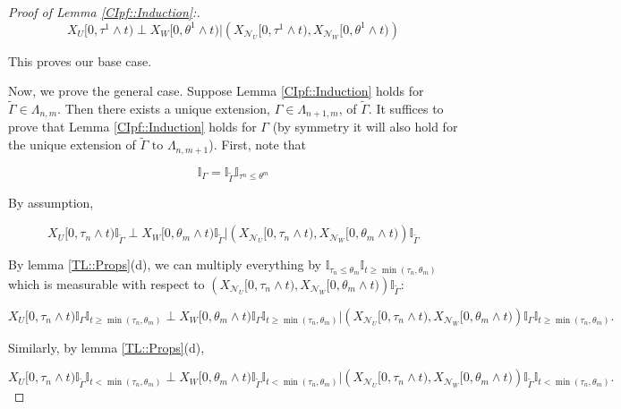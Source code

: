 \documentclass[12pt]{article}
\newcommand{\mb}{\mathbb}
\newcommand{\mc}{\mathcal}
\newcommand{\te}{\text}
\newcommand{\ind}{\hspace{24pt}}
\newcommand{\neigh}[1]{\mc{N}_{#1}}					%
\newcommand{\indx}[1]{^{#1}}						%
\newcommand{\Xf}{X}									%
\newcommand{\vind}[1]{_{#1}}						%
\newcommand{\tmi}[1]{#1}							%
\newcommand{\seto}{U}								%
\newcommand{\sett}{W}								%
\newcommand{\rtt}{\theta}							%
\newcommand{\apath}{\Gamma}						%
\newcommand{\pathset}[2]{\Lambda_{#1,#2}}		%
\newcommand{\indo}{n}							%
\newcommand{\indt}{m}							%
\newcommand{\alt}[1]{\tilde{#1}}					%
\newcommand{\rt}{\tau}								%
\renewcommand{\it}[1]{_{#1}}						%
\begin{document}
\begin{proof}[Proof of Lemma \ref{CIpf::Induction}:]
\[\Xf\vind{\seto}\tmi{[0,\rt\indx{1}\wedge t)}\perp \Xf\vind{\sett}\tmi{[0,\rtt\indx{1}\wedge t)}|\left(\Xf\vind{\neigh{\seto}}\tmi{[0,\rt\indx{1}\wedge t)},\Xf\vind{\neigh{\sett}}\tmi{[0,\rtt\indx{1}\wedge t)}\right)\]

This proves our base case.

\ind Now, we prove the general case. Suppose Lemma \ref{CIpf::Induction} holds for \(\alt{\apath} \in \pathset{\indo}{\indt}\). Then there exists a unique extension, \(\apath \in \pathset{\indo+1}{\indt}\), of \(\alt{\apath}\). It suffices to prove that Lemma \ref{CIpf::Induction} holds for \(\apath\) (by symmetry it will also hold for the unique extension of \(\alt{\apath} \te{ to } \pathset{\indo}{\indt+1}\)). First, note that

\begin{equation}
\mb{I}_{\apath} = \mb{I}_{\alt{\apath}}\mb{I}_{\rt\indx{\indo} \leq \rtt\indx{\indt}}
\label{CIpf::extpath}
\end{equation}

By assumption,

\[\Xf\vind{\seto}\tmi{[0,\rt\it{\indo}\wedge t)}\mb{I}_{\alt{\apath}}\perp \Xf\vind{\sett}\tmi{[0,\rtt\it{\indt}\wedge t)}\mb{I}_{\alt{\apath}}|\left(\Xf\vind{\neigh{\seto}}\tmi{[0,\rt\it{\indo}\wedge t)},\Xf\vind{\neigh{\sett}}\tmi{[0,\rtt\it{\indt}\wedge t)}\right)\mb{I}_{\alt{\apath}}\]

By lemma \ref{TL::Props}(d), we can multiply everything by \(\mb{I}_{\rt\it{\indo} \leq \rtt\it{\indt}}\mb{I}_{t \geq \min(\rt\it{\indo},\rtt\it{\indt})}\) which is measurable with respect to \(\left(\Xf\vind{\neigh{\seto}}\tmi{[0,\rt\it{\indo}\wedge t)},\Xf\vind{\neigh{\sett}}\tmi{[0,\rtt\it{\indt}\wedge t)}\right)\mb{I}_{\alt{\apath}}\):

\begin{equation}
\Xf\vind{\seto}\tmi{[0,\rt\it{\indo}\wedge t)}\mb{I}_{\apath}\mb{I}_{t \geq \min(\rt\it{\indo},\rtt\it{\indt})}\perp \Xf\vind{\sett}\tmi{[0,\rtt\it{\indt}\wedge t)}\mb{I}_{\apath}\mb{I}_{t \geq \min(\rt\it{\indo},\rtt\it{\indt})}|\left(\Xf\vind{\neigh{\seto}}\tmi{[0,\rt\it{\indo}\wedge t)},\Xf\vind{\neigh{\sett}}\tmi{[0,\rtt\it{\indt}\wedge t)}\right)\mb{I}_{\apath}\mb{I}_{t \geq \min(\rt\it{\indo},\rtt\it{\indt})}.
\label{CIpf::bigTind}
\end{equation}

Similarly, by lemma \ref{TL::Props}(d),

\[\Xf\vind{\seto}\tmi{[0,\rt\it{\indo}\wedge t)}\mb{I}_{\alt{\apath}}\mb{I}_{t < \min(\rt\it{\indo},\rtt\it{\indt})}\perp \Xf\vind{\sett}\tmi{[0,\rtt\it{\indt}\wedge t)}\mb{I}_{\alt{\apath}}\mb{I}_{t < \min(\rt\it{\indo},\rtt\it{\indt})}|\left(\Xf\vind{\neigh{\seto}}\tmi{[0,\rt\it{\indo}\wedge t)},\Xf\vind{\neigh{\sett}}\tmi{[0,\rtt\it{\indt}\wedge t)}\right)\mb{I}_{\alt{\apath}}\mb{I}_{t < \min(\rt\it{\indo},\rtt\it{\indt})}.\]


\end{proof}
\end{document}
